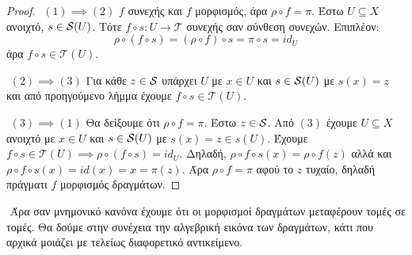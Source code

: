 \begin{figure}[H]
    \centering
{}
\end{figure}


\begin{proof}
    $ $\newline
    $(1)\implies (2)$ $f$ συνεχής και $f$ μορφισμός, άρα $\rho \circ f = \pi$. Έστω $U \subseteq X$  ανοιχτό, $s \in \mathcal{S} (U)$. Τότε $f\circ s : U \rightarrow \mathcal{T}$ συνεχής σαν σύνθεση συνεχών. Επιπλέον:
    $$\rho \circ (f\circ s) = (\rho \circ f)\circ s = \pi \circ s = id_U$$ άρα $f\circ s \in \mathcal{T} (U)$.

    $ $\newline
    $(2) \implies (3)$ Για κάθε $z \in \mathcal{S}$ υπάρχει $U$ με $x \in U$ και $s \in \mathcal{S} (U)$ με $s(x) = z$ και από προηγούμενο λήμμα έχουμε $f \circ s \in \mathcal{T}(U)$.

    $ $\newline
    $(3) \implies (1)$ Θα δείξουμε ότι $\rho \circ f = \pi$. Έστω $z \in \mathcal{S}$. Από $(3)$ έχουμε $U \subseteq X$ ανοιχτό με $x \in U$ και $s \in \mathcal{S} (U)$ με $s(x) = z \in s(U)$. Έχουμε $f\circ s \in \mathcal{T}(U) \implies \rho \circ (f\circ s) = id_U$. Δηλαδή, $\rho \circ f \circ s (x) = \rho \circ f(z)$ αλλά και $\rho \circ f \circ s(x) = id(x) = x = \pi (z)$. Άρα $\rho \circ f = \pi$ αφού το $z$ τυχαίο, δηλαδή πράγματι $f$ μορφισμός δραγμάτων.

\end{proof}

$ $\newline
Άρα σαν μνημονικό κανόνα έχουμε ότι οι μορφισμοί δραγμάτων μεταφέρουν τομές σε τομές. Θα δούμε στην συνέχεια την αλγεβρική εικόνα των δραγμάτων, κάτι που αρχικά μοιάζει με τελείως διαφορετικό αντικείμενο.


